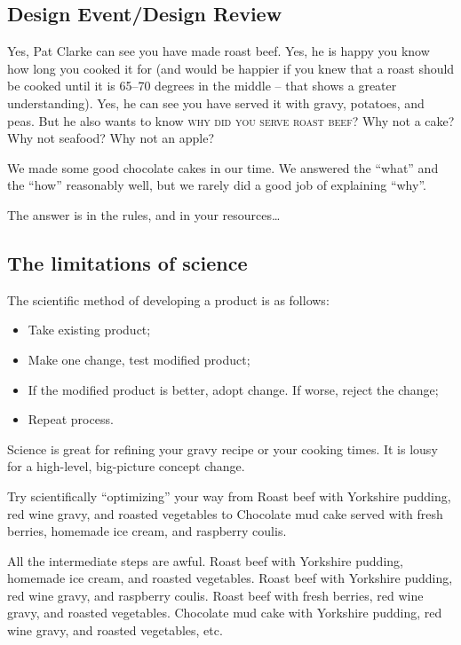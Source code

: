 \documentclass[10pt, a4paper, article, oneside, twocolumn, final]{memoir}
\begin{document}
\subsection*{Design Event/\allowbreak Design Review}
Yes, Pat Clarke can see you have made roast beef. Yes, he is happy you know how long you cooked it for (and would be happier if you knew that a roast should be cooked until it is \numrange{65}{70} degrees in the middle -- that shows a greater understanding). Yes, he can see you have served it with gravy, potatoes, and peas. But he also wants to know \textsc{why did you serve roast beef}? Why not a cake? Why not seafood? Why not an apple? 

We made some good chocolate cakes in our time. We answered the “what” and the “how” reasonably well, but we rarely did a good job of explaining “why”. 

The answer is in the rules, and in your resources\ldots 


\subsection*{The limitations of science}
The scientific method of developing a product is as follows: 

\begin{itemize}
    \item Take existing product;
    \item Make one change, test modified product;
    \item If the modified product is better, adopt change. If worse, reject the change;
    \item Repeat process.
\end{itemize}

Science is great for refining your gravy recipe or your cooking times. It is lousy for a high-level, big-picture concept change. 

Try scientifically “optimizing” your way from Roast beef with Yorkshire pudding, red wine gravy, and roasted vegetables to Chocolate mud cake served with fresh berries, homemade ice cream, and raspberry coulis.

All the intermediate steps are awful. Roast beef with Yorkshire pudding, homemade ice cream, and roasted vegetables. Roast beef with Yorkshire pudding, red wine gravy, and raspberry coulis. Roast beef with fresh berries, red wine gravy, and roasted vegetables. Chocolate mud cake with Yorkshire pudding, red wine gravy, and roasted vegetables, etc. 
\end{document}
